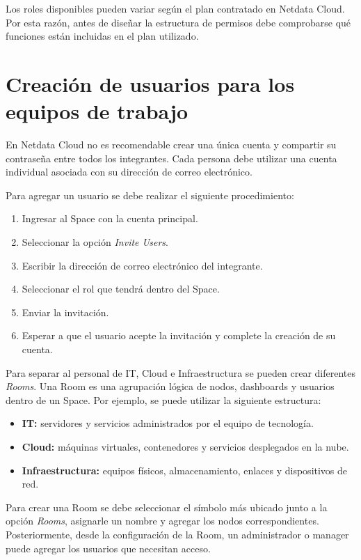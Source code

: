 Los roles disponibles pueden variar según el plan contratado en Netdata Cloud. Por esta
razón, antes de diseñar la estructura de permisos debe comprobarse qué funciones están
incluidas en el plan utilizado.



\section{Creación de usuarios para los equipos de trabajo}

En Netdata Cloud no es recomendable crear una única cuenta y compartir su contraseña
entre todos los integrantes. Cada persona debe utilizar una cuenta individual asociada
con su dirección de correo electrónico.

Para agregar un usuario se debe realizar el siguiente procedimiento:

\begin{enumerate}
    \item Ingresar al Space con la cuenta principal.
    \item Seleccionar la opción \textit{Invite Users}.
    \item Escribir la dirección de correo electrónico del integrante.
    \item Seleccionar el rol que tendrá dentro del Space.
    \item Enviar la invitación.
    \item Esperar a que el usuario acepte la invitación y complete la creación de su
          cuenta.
\end{enumerate}

Para separar al personal de IT, Cloud e Infraestructura se pueden crear diferentes
\textit{Rooms}. Una Room es una agrupación lógica de nodos, dashboards y usuarios
dentro de un Space. Por ejemplo, se puede utilizar la siguiente estructura:

\begin{itemize}
    \item \textbf{IT:} servidores y servicios administrados por el equipo de tecnología.
    \item \textbf{Cloud:} máquinas virtuales, contenedores y servicios desplegados en la
          nube.
    \item \textbf{Infraestructura:} equipos físicos, almacenamiento, enlaces y
          dispositivos de red.
\end{itemize}

Para crear una Room se debe seleccionar el símbolo más ubicado junto a la opción
\textit{Rooms}, asignarle un nombre y agregar los nodos correspondientes. Posteriormente,
desde la configuración de la Room, un administrador o manager puede agregar los
usuarios que necesitan acceso.

